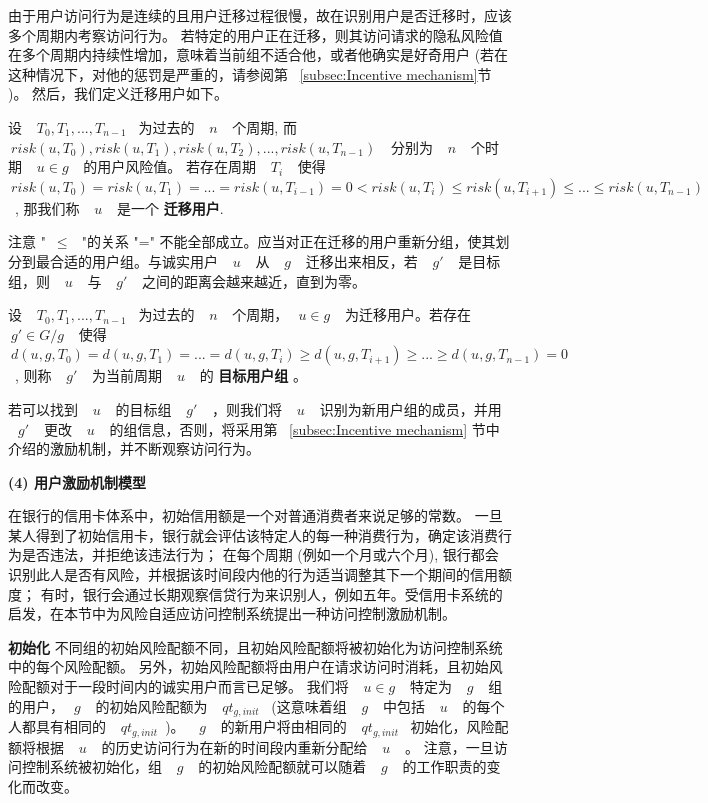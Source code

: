 由于用户访问行为是连续的且用户迁移过程很慢，故在识别用户是否迁移时，应该多个周期内考察访问行为。 若特定的用户正在迁移，则其访问请求的隐私风险值在多个周期内持续性增加，意味着当前组不适合他，或者他确实是好奇用户 (若在这种情况下，对他的惩罚是严重的，请参阅第 ~\ref{subsec:Incentive mechanism}节 )。 然后，我们定义迁移用户如下。

\begin{definition}%
	\label{def:migrating user}
	设 ~$~T_0,T_1,...,T_{n-1}$~ 为过去的 ~$~n~$~ 个周期, 而 ~$~risk(u,T_0),risk(u,T_1),risk(u,T_2),..., risk(u,T_{n-1})~$~ 分别为 ~$~n~$~ 个时期 ~$~u\in g~$~ 的用户风险值。 若存在周期 ~$~T_i~$~ 使得 ~$~risk(u,T_0) = risk(u,T_1) = ... = risk(u,T_{i-1}) =0  < risk(u,T_{i}) \leq risk(u,T_{i+1}) \leq ... \leq risk(u,T_{n-1})~$~, 那我们称 ~$~u~$~ 是一个 \textbf{迁移用户}.
\end{definition}

注意 "~$\leq~$~"的关系 "=" 不能全部成立。应当对正在迁移的用户重新分组，使其划分到最合适的用户组。与诚实用户 ~$~u~$~ 从 ~$~g~$~ 迁移出来相反，若 ~$~g'~$~ 是目标组，则 ~$~u~$~ 与 ~$~g'~$~ 之间的距离会越来越近，直到为零。

\begin{definition}%
	\label{def:target group}
	设 ~$~T_0,T_1,...,T_{n-1}$~ 为过去的 ~$~n~$~ 个周期，~$~u \in g~$~ 为迁移用户。若存在 ~$~g' \in G/g~$~ 使得 ~$~d(u,g,T_0) = d(u,g,T_1) = ... = d(u,g,T_i) \geq d(u,g,T_{i+1}) \geq ... \geq d(u,g,T_{n-1}) = 0~$~, 则称 ~$~g'~$~ 为当前周期 ~$~u~$~ 的 \textbf{目标用户组} 。 
\end{definition}

若可以找到 ~$~u~$~ 的目标组 ~$~g'~$~ ，则我们将 ~$~u~$~ 识别为新用户组的成员，并用 ~$~g'~$~ 更改 ~$~u~$~ 的组信息，否则，将采用第 ~\ref{subsec:Incentive mechanism} 节中介绍的激励机制，并不断观察访问行为。

\textbf{(4) 用户激励机制模型}


在银行的信用卡体系中，初始信用额是一个对普通消费者来说足够的常数。 一旦某人得到了初始信用卡，银行就会评估该特定人的每一种消费行为，确定该消费行为是否违法，并拒绝该违法行为； 在每个周期 (例如一个月或六个月), 银行都会识别此人是否有风险，并根据该时间段内他的行为适当调整其下一个期间的信用额度； 有时，银行会通过长期观察信贷行为来识别人，例如五年。受信用卡系统的启发，在本节中为风险自适应访问控制系统提出一种访问控制激励机制。

\textbf{初始化} 不同组的初始风险配额不同，且初始风险配额将被初始化为访问控制系统中的每个风险配额。 另外，初始风险配额将由用户在请求访问时消耗，且初始风险配额对于一段时间内的诚实用户而言已足够。 我们将 ~$~u \in g~$~ 特定为 ~$~g~$~ 组的用户，~$~g~$~ 的初始风险配额为 ~$~qt_{g,init}$~ (这意味着组 ~$~g~$~ 中包括 ~$~u~$~ 的每个人都具有相同的 ~$~qt_{g,init}$~)。 ~$~g~$~ 的新用户将由相同的 ~$~qt_{g,init}$~ 初始化，风险配额将根据 ~$~u~$~ 的历史访问行为在新的时间段内重新分配给 ~$~u~$~ 。 注意，一旦访问控制系统被初始化，组 ~$~g~$~ 的初始风险配额就可以随着 ~$~g~$~ 的工作职责的变化而改变。

